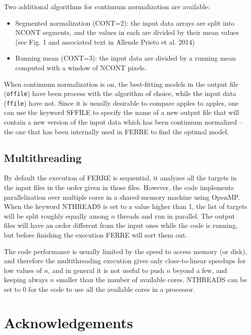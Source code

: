 \documentclass[12pt]{article}
\begin{document}
Two additional algorithms for continuum normalization are available:
\begin{itemize}
\item Segmented normalization (CONT=2): the input data arrays are split into NCONT segments, 
and the values in each are divided by their mean values (see Fig. 1 and associated text in 
Allende Prieto et al. 2014)
\item Running mean (CONT=3): the input data are divided by a running mean computed with a window of NCONT pixels.
\end{itemize}

When continuum normalization is on, the best-fitting models in the output file ({\tt offile})
have been process with the algorithm of choice, while the input data ({\tt ffile}) have not.
Since it is usually desirable to compare apples to apples, one can use the keyword 
SFFILE to specify the name of a new output file that will contain a new version of the input data
which has been continuum normalized -- the one that has been internally used in FERRE to 
find the optimal model.


\subsection{Multithreading}

By default the execution of FERRE is sequential, it analyzes all the targets in 
the input files in the order given in those files. However, the code implements 
parallelization over multiple cores in a shared-memory machine using OpenMP.
When the keyword NTHREADS is set to a value higher than 1, the list of targets
will be split roughly equally among $n$ threads and run in parallel. The output
files will have an order different from the input ones while the code is running,
but before finishing the execution FERRE will sort them out.

The code performance is usually limited by the speed to access memory (or disk),
and therefore the multithreading execution gives only close-to-linear speedups 
for low values of $n$, and in general it is not useful to push $n$ beyond a few,
and keeping always $n$ smaller than the number of available cores. NTHREADS can
be set to 0 for the code to use all the available cores in a processor.

\section{Acknowledgements}
\end{document}
